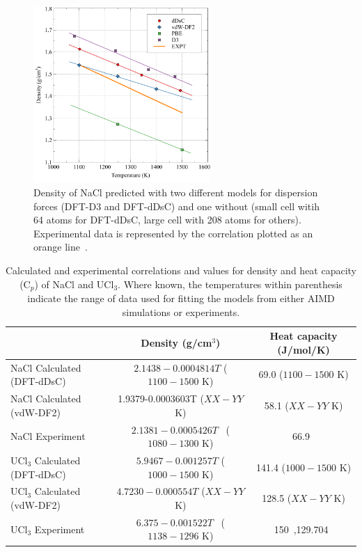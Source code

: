 \documentclass[preprint,3p,10pt,onecolumn,number,sort&compress]{elsarticle}
\begin{document}
\begin{figure}[htb]
\centering
\includegraphics[width=0.6\textwidth]{fig4.pdf}
\caption{Density of NaCl predicted with two different models for dispersion forces (DFT-D3 and DFT-dDsC) and one without (small cell witih 64 atoms for DFT-dDsC, large cell with 208 atoms for others). Experimental data is represented by the correlation plotted as an orange line~\cite{Janz1988}.}  
\label{fig:NaCldensity}
\end{figure}


\begin{table}[hb!]
\centering
{\color{red} 
\begin{tabular}{lcc}
\hline
\hline
& Density (g/cm$^3$) &Heat capacity (J/mol/K) \\
\hline
NaCl Calculated (DFT-dDsC)	&$2.1438-0.0004814T$ ($1100 - 1500$ K) &69.0 ($1100 - 1500$ K)\\
NaCl Calculated (vdW-DF2)	& 1.9379-0.0003603T ($XX - YY$ K)& 58.1 ($XX - YY$ K)\\
NaCl Experiment	&$2.1381-0.0005426T$~\cite{Janz1988} ($1080-1300$ K) &66.9~\cite{NIST} \\	
UCl$_3$ Calculated (DFT-dDsC) &$5.9467-0.001257T$ ($1000-1500$ K) &141.4 ($1000-1500$ K)\\	
UCl$_3$ Calculated (vdW-DF2) &$4.7230-0.000554T$ ($XX - YY$ K) & 128.5 ($XX - YY$ K) \\	
UCl$_3$ Experiment	&$6.375-0.001522T$~\cite{Desyatnik} ($1138-1296$ K)&150~\cite{BENES2008},129.704~\cite{YIN2020} \\
\hline
\hline
\end{tabular}
}
\caption{Calculated and experimental correlations and values for density and heat capacity (C$_p$) of NaCl and UCl$_3$. {\color{red} Where known, the temperatures within parenthesis indicate the range of data used for fitting the models from either AIMD simulations or experiments.} }
\label{table:NaCldensityetc}
\end{table}
\end{document}
